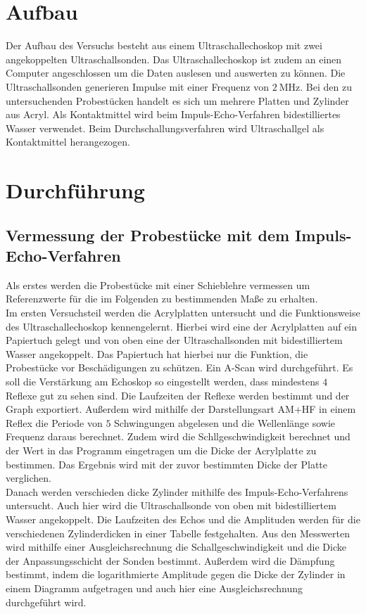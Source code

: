 \section{Aufbau}
\label{sec:Aufbau}
Der Aufbau des Versuchs besteht aus einem Ultraschallechoskop mit zwei angekoppelten Ultraschallsonden. Das Ultraschallechoskop
ist zudem an einen Computer angeschlossen um die Daten auslesen und auswerten zu können.
Die Ultraschallsonden generieren Impulse mit einer Frequenz von $\qty{2}{\mega\hertz}$.
Bei den zu untersuchenden Probestücken handelt es sich um mehrere Platten und Zylinder aus Acryl.
Als Kontaktmittel wird beim Impuls-Echo-Verfahren bidestilliertes Wasser verwendet. Beim Durchschallungsverfahren wird
Ultraschallgel als Kontaktmittel herangezogen.


\section{Durchführung}
\label{sec:Durchführung}
\subsection{Vermessung der Probestücke mit dem Impuls-Echo-Verfahren}
\label{sub:ImpEch_durch}
Als erstes werden die Probestücke mit einer Schieblehre vermessen um Referenzwerte für die im Folgenden zu bestimmenden Maße zu erhalten.\\

Im ersten Versuchsteil werden die Acrylplatten untersucht und die Funktionsweise des Ultraschallechoskop kennengelernt.
Hierbei wird eine der Acrylplatten auf ein Papiertuch gelegt und von oben eine der Ultraschallsonden mit bidestilliertem Wasser angekoppelt.
Das Papiertuch hat hierbei nur die Funktion, die Probestücke vor Beschädigungen zu schützen.
Ein A-Scan wird durchgeführt. Es soll die Verstärkung am Echoskop so eingestellt werden, dass mindestens $4$ Reflexe gut zu sehen sind.
Die Laufzeiten der Reflexe werden bestimmt und der Graph exportiert.
Außerdem wird mithilfe der Darstellungsart AM+HF in einem Reflex die Periode von $5$ Schwingungen abgelesen 
und die Wellenlänge sowie Frequenz daraus berechnet.
Zudem wird die Schllgeschwindigkeit berechnet und der Wert in das Programm eingetragen um die Dicke der Acrylplatte zu bestimmen.
Das Ergebnis wird mit der zuvor bestimmten Dicke der Platte verglichen.\\

Danach werden verschieden dicke Zylinder mithilfe des Impuls-Echo-Verfahrens untersucht.
Auch hier wird die Ultraschallsonde von oben mit bidestilliertem Wasser angekoppelt.
Die Laufzeiten des Echos und die Amplituden werden für die verschiedenen Zylinderdicken in einer Tabelle festgehalten.
Aus den Messwerten wird mithilfe einer Ausgleichsrechnung die Schallgeschwindigkeit und die Dicke der Anpassungsschicht
der Sonden bestimmt.
Außerdem wird die Dämpfung bestimmt, indem die logarithmierte Amplitude gegen die Dicke der Zylinder in einem Diagramm aufgetragen und 
auch hier eine Ausgleichsrechnung durchgeführt wird.

